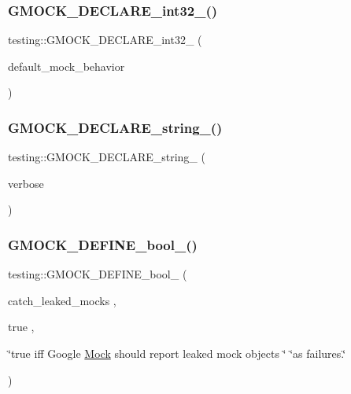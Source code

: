 \mbox{\label{namespacetesting_a8db48e64b7ad3536f6ccf28ce39f9111}} 
\subsubsection{\texorpdfstring{GMOCK\_DECLARE\_int32\_()}{GMOCK\_DECLARE\_int32\_()}}
{\footnotesize\ttfamily testing\+::\+G\+M\+O\+C\+K\+\_\+\+D\+E\+C\+L\+A\+R\+E\+\_\+int32\+\_\+ (\begin{DoxyParamCaption}\item[{default\+\_\+mock\+\_\+behavior}]{ }\end{DoxyParamCaption})}

\mbox{\label{namespacetesting_a4dd099d1d538f26a16fcc2f94011b37e}} 
\subsubsection{\texorpdfstring{GMOCK\_DECLARE\_string\_()}{GMOCK\_DECLARE\_string\_()}}
{\footnotesize\ttfamily testing\+::\+G\+M\+O\+C\+K\+\_\+\+D\+E\+C\+L\+A\+R\+E\+\_\+string\+\_\+ (\begin{DoxyParamCaption}\item[{verbose}]{ }\end{DoxyParamCaption})}

\mbox{\label{namespacetesting_aca5af0e8943ba53352537ab84233b47f}} 
\subsubsection{\texorpdfstring{GMOCK\_DEFINE\_bool\_()}{GMOCK\_DEFINE\_bool\_()}}
{\footnotesize\ttfamily testing\+::\+G\+M\+O\+C\+K\+\_\+\+D\+E\+F\+I\+N\+E\+\_\+bool\+\_\+ (\begin{DoxyParamCaption}\item[{catch\+\_\+leaked\+\_\+mocks}]{,  }\item[{true}]{,  }\item[{\char`\"{}true iff Google \mbox{\hyperlink{class_mock}{Mock}} should report leaked mock objects \char`\"{} \char`\"{}as failures.\char`\"{}}]{ }\end{DoxyParamCaption})}

